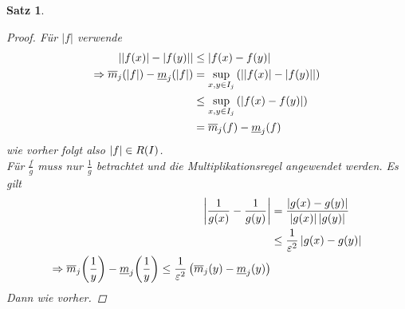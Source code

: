 \documentclass[11pt, twoside, a4paper]{article}
\theoremstyle{plain}
\newtheorem{satz}[blockelement]{Satz}
\newcommand{\pair}[1]{\left(#1\right)}
\newcommand{\of}[1]{\mathopen{}\mathclose{}\bgroup\left(#1\aftergroup\egroup\right)}
\newcommand{\abs}[1]{\left\lvert#1\right\rvert}
\newcommand{\impl}[0]{\Rightarrow{}}
\begin{document}
\begin{satz}
\begin{proof}
            Für $\abs{f}$ verwende
            \begin{align*}
                \abs{\abs{f(x)}- \abs{f(y)}} &\leq \abs{f(x) - f(y)}\\
                \impl \overline{m}_j\of{\abs{f}} - \underline{m}_j\of{\abs{f}} &= \sup_{x,y\in I_j}\pair{\abs{\abs{f(x)} - \abs{f(y)}}}\\
                &\leq \sup_{x,y\in I_j} \pair{\abs{f(x)-f(y)}}\\
                &= \overline{m}_j\of{f} - \underline{m}_j\of{f}
            \end{align*}
            wie vorher folgt also $\abs{f} \in R\of{I}$.\\
            Für $\frac{f}{g}$ muss nur $\frac{1}{g}$ betrachtet und die Multiplikationsregel angewendet werden. Es gilt
            \begin{align*}
                \abs{\frac{1}{g(x)}- \frac{1}{g(y)}} &= \frac{\abs{g(x)-g(y)}}{\abs{g(x)}\abs{g(y)}}\\
                &\leq \frac{1}{\varepsilon^2}\abs{g(x) - g(y)}\\
                \impl \overline{m}_j\of{\frac{1}{y}}  - \underline{m}_j\of{\frac{1}{y}} \leq \frac{1}{\varepsilon^2} \pair{\overline{m}_j\of{y} - \underline{m}_j\of{y}}
            \end{align*}
            Dann wie vorher.\qedhere
        \end{proof}
    \end{satz}
\end{document}
